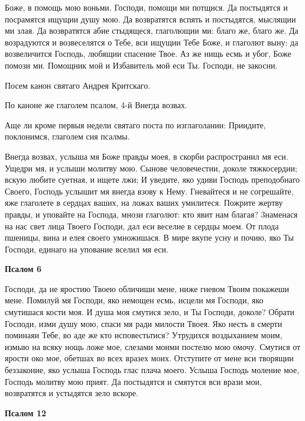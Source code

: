 Боже, в помощь мою воньми. Господи, помощи ми потщися. Да постыдятся и посрамятся ищущии душу мою. Да возвратятся вспять и постыдятся, мыслящии ми злая. Да возвратятся абие стыдящеся, глаголющии ми: благо же, благо же. Да возрадуются и возвеселятся о Тебе, вси ищущии Тебе Боже, и глаголют выну: да возвеличится Господь, любящии спасение Твое. Аз же нищь есмь и убог, Боже помози ми. Помощник мой и Избавитель мой еси Ты. Господи, не закосни.


Посем канон святаго Андрея Критскаго.


По каноне же глаголем псалом, 4-й Внегда возвах.


Аще ли кроме первыя недели святаго поста по изглаголании: Приидите, поклонимся, глаголем сия псалмы.


Внегда возвах, услыша мя Боже правды моея, в скорби распространил мя еси. Ущедри мя, и услыши молитву мою. Сынове человечестии, доколе тяжкосердии; вскую любите суетная, и ищете лжи; И уведите, яко удиви Господь преподобнаго Своего, Господь услышит мя внегда взову к Нему. Гневайтеся и не согрешайте, яже глаголете в сердцах ваших, на ложах ваших умилитеся. Пожрите жертву правды, и уповайте на Господа, мнози глаголют: кто явит нам благая? 3наменася на нас свет лица Твоего Господи, дал еси веселие в сердцы моем. От плода пшеницы, вина и елея своего умножишася. В мире вкупе усну и почию, яко Ты Господи, единаго на упование вселил мя еси.







\bfseries Псалом 6\normalfont{}


Господи, да не яростию Твоею обличиши мене, ниже гневом Твоим покажеши мене. Помилуй мя Господи, яко немощен есмь, исцели мя Господи, яко смутишася кости моя. И душа моя смутися зело, и Ты Господи, доколе? Обрати Господи, изми душу мою, спаси мя ради милости Твоея. Яко несть в смерти поминаяи Тебе, во аде же кто исповестьтися? Утрудихся воздыханием моим, измыю на всяку нощь ложе мое, слезами моими постелю мою омочу. Смутися от ярости око мое, обетшах во всех вразех моих. Отступите от мене вси творящии беззаконие, яко услыша Господь глас плача моего. Услыша Господь моление мое, Господь молитву мою прият. Да постыдятся и смятутся вси врази мои, возвратятся и устыдятся зело вскоре.







\bfseries Псалом 12\normalfont{}


